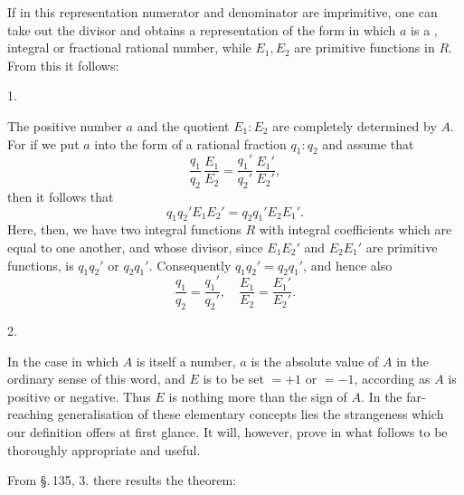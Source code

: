 
If in this representation numerator and denominator are imprimitive, one can take out the divisor
and obtains a representation of the form
in which $a$ is a , integral or fractional rational number,
while $E_1, E_2$ are primitive functions in $R$. From this
it follows:

1. 

The positive number $a$ and the quotient $E_1:E_2$ are completely
determined by $A$. For if we put $a$ into the form of a
rational fraction $q_1:q_2$ and assume that
\[
\frac{q_1}{q_2}\,\frac{E_1}{E_2} = \frac{q_1'}{q_2'}\,\frac{E_1'}{E_2'},
\]
then it follows that
\[
q_1 q_2' E_1 E_2' = q_2 q_1' E_2 E_1'.
\]
Here, then, we have two integral functions $R$ with integral
coefficients which are equal to one another, and whose divisor,
since $E_1 E_2'$ and $E_2 E_1'$ are primitive functions, is $q_1 q_2'$
or $q_2 q_1'$. Consequently $q_1 q_2' = q_2 q_1'$, and hence
also
\[
\frac{q_1}{q_2} = \frac{q_1'}{q_2'}, \quad \frac{E_1}{E_2} = \frac{E_1'}{E_2'}.
\]

2. 

In the case in which $A$ is itself a number, $a$ is the absolute
value of $A$ in the ordinary sense of this word, and $E$
is to be set $= +1$ or $= -1$, according as $A$ is positive or
negative. Thus $E$ is nothing more than the sign of
$A$. In the far-reaching generalisation of these elementary
concepts lies the strangeness which our definition offers at first
glance. It will, however, prove in what follows to be thoroughly
appropriate and useful.

From \S.\,135, 3. there results the theorem:
